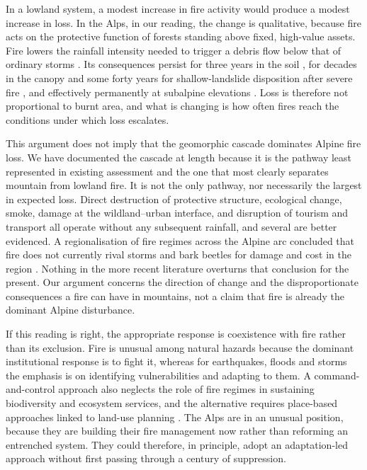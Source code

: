 \documentclass[11pt,a4paper]{article}
\begin{document}
In a lowland system, a modest increase in fire activity would produce a modest increase in loss. In the Alps, in our reading, the change is qualitative, because fire acts on the protective function of forests standing above fixed, high-value assets. Fire lowers the rainfall intensity needed to trigger a debris flow below that of ordinary storms \citep{laporta_postwildfire_2025}. Its consequences persist for three years in the soil \citep{negri_wildfire_2026}, for decades in the canopy and some forty years for shallow-landslide disposition after severe fire \citep{stritih_alternative_2023, gehring_shallow_2019}, and effectively permanently at subalpine elevations \citep{degiuli_arrested_2024}. Loss is therefore not proportional to burnt area, and what is changing is how often fires reach the conditions under which loss escalates.

This argument does not imply that the geomorphic cascade dominates Alpine fire loss. We have documented the cascade at length because it is the pathway least represented in existing assessment and the one that most clearly separates mountain from lowland fire. It is not the only pathway, nor necessarily the largest in expected loss. Direct destruction of protective structure, ecological change, smoke, damage at the wildland--urban interface, and disruption of tourism and transport all operate without any subsequent rainfall, and several are better evidenced. A regionalisation of fire regimes across the Alpine arc concluded that fire does not currently rival storms and bark beetles for damage and cost in the region \citep{conedera_characterizing_2018}. Nothing in the more recent literature overturns that conclusion for the present. Our argument concerns the direction of change and the disproportionate consequences a fire can have in mountains, not a claim that fire is already the dominant Alpine disturbance.

If this reading is right, the appropriate response is coexistence with fire rather than its exclusion. Fire is unusual among natural hazards because the dominant institutional response is to fight it, whereas for earthquakes, floods and storms the emphasis is on identifying vulnerabilities and adapting to them. A command-and-control approach also neglects the role of fire regimes in sustaining biodiversity and ecosystem services, and the alternative requires place-based approaches linked to land-use planning \citep{moritz_learning_2014}. The Alps are in an unusual position, because they are building their fire management now rather than reforming an entrenched system. They could therefore, in principle, adopt an adaptation-led approach without first passing through a century of suppression.
\end{document}
